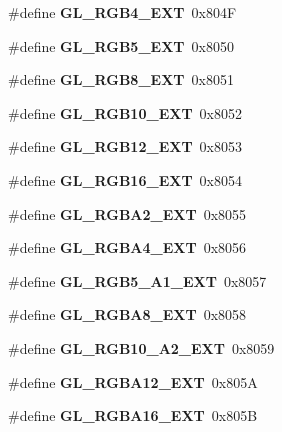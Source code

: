 \begin{DoxyCompactItemize}
\item 
\#define {\bfseries G\+L\+\_\+\+R\+G\+B4\+\_\+\+E\+X\+T}~0x804\+F\label{_s_d_l__opengl_8h_abea3961b785b16051ae1159ee7899cd2}

\item 
\#define {\bfseries G\+L\+\_\+\+R\+G\+B5\+\_\+\+E\+X\+T}~0x8050\label{_s_d_l__opengl_8h_a6ad65592b54dfc79c24b6dd9ca27eaaf}

\item 
\#define {\bfseries G\+L\+\_\+\+R\+G\+B8\+\_\+\+E\+X\+T}~0x8051\label{_s_d_l__opengl_8h_aaabcecc3dfe39952ddb4f2e49dbc0aaa}

\item 
\#define {\bfseries G\+L\+\_\+\+R\+G\+B10\+\_\+\+E\+X\+T}~0x8052\label{_s_d_l__opengl_8h_a412a965b9f8f7aa4c6b8379785729a3a}

\item 
\#define {\bfseries G\+L\+\_\+\+R\+G\+B12\+\_\+\+E\+X\+T}~0x8053\label{_s_d_l__opengl_8h_af8c259c8b5a8437953f9a81fbbc0f9af}

\item 
\#define {\bfseries G\+L\+\_\+\+R\+G\+B16\+\_\+\+E\+X\+T}~0x8054\label{_s_d_l__opengl_8h_a18c67a0ae67a254d1cc03ca0bb719e70}

\item 
\#define {\bfseries G\+L\+\_\+\+R\+G\+B\+A2\+\_\+\+E\+X\+T}~0x8055\label{_s_d_l__opengl_8h_ae9cf65a62138576a1677003f6474ce1e}

\item 
\#define {\bfseries G\+L\+\_\+\+R\+G\+B\+A4\+\_\+\+E\+X\+T}~0x8056\label{_s_d_l__opengl_8h_ad409795f8b17abcf52d3fa5c86a1f266}

\item 
\#define {\bfseries G\+L\+\_\+\+R\+G\+B5\+\_\+\+A1\+\_\+\+E\+X\+T}~0x8057\label{_s_d_l__opengl_8h_a9a3204d8b9137b2eb6e834a0e2a8854b}

\item 
\#define {\bfseries G\+L\+\_\+\+R\+G\+B\+A8\+\_\+\+E\+X\+T}~0x8058\label{_s_d_l__opengl_8h_ad386e8d98e3b2373dec5339e3e66f5f9}

\item 
\#define {\bfseries G\+L\+\_\+\+R\+G\+B10\+\_\+\+A2\+\_\+\+E\+X\+T}~0x8059\label{_s_d_l__opengl_8h_a2e68d1bf78c40b8ff2864430a4e5a4df}

\item 
\#define {\bfseries G\+L\+\_\+\+R\+G\+B\+A12\+\_\+\+E\+X\+T}~0x805\+A\label{_s_d_l__opengl_8h_a80efdaa7ab6f57b3eb8e8cf0202ff167}

\item 
\#define {\bfseries G\+L\+\_\+\+R\+G\+B\+A16\+\_\+\+E\+X\+T}~0x805\+B\label{_s_d_l__opengl_8h_a7ac6a9e37905c215118d969e90fb712f}


\end{DoxyCompactItemize}
